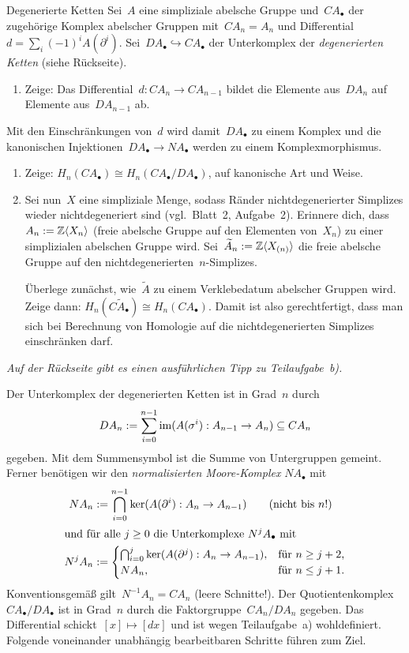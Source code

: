 \documentclass{uebblatt}
\begin{document}
\begin{aufgabe}{Degenerierte Ketten}
Sei~$A$ eine simpliziale abelsche Gruppe und~$CA_\bullet$ der zugehörige
Komplex abelscher Gruppen mit~$CA_n = A_n$ und Differential~$d = \sum_i (-1)^i
A(\partial^i)$. Sei~$DA_\bullet \hookrightarrow CA_\bullet$ der Unterkomplex
der \emph{degenerierten Ketten} (siehe Rückseite).
\begin{enumerate}
\item Zeige: Das Differential~$d : CA_n \to CA_{n-1}$ bildet die Elemente
aus~$DA_n$ auf Elemente aus~$DA_{n-1}$ ab.
\end{enumerate}
Mit den Einschränkungen von~$d$ wird damit~$DA_\bullet$ zu einem Komplex und die
kanonischen Injektionen~$DA_\bullet \to NA_\bullet$ werden zu einem Komplexmorphismus.
\begin{enumerate}
\addtocounter{enumi}{1}
\item Zeige: $H_n(CA_\bullet) \cong H_n(CA_\bullet/DA_\bullet)$, auf kanonische
Art und Weise.
\item Sei nun~$X$ eine simpliziale Menge, sodass Ränder nichtdegenerierter
Simplizes wieder nichtdegeneriert sind (vgl.~Blatt~2, Aufgabe~2). Erinnere
dich, dass~$A_n := \mathbb{Z}\langle X_n \rangle$ (freie abelsche Gruppe auf den
Elementen von~$X_n$) zu einer simplizialen abelschen Gruppe wird.
Sei~$\widetilde A_n := \mathbb{Z}\langle X_{(n)} \rangle$ die freie abelsche Gruppe
auf den nichtdegenerierten~$n$-Simplizes.

Überlege zunächst, wie~$\widetilde A$ zu einem Verklebedatum abelscher
Gruppen wird.
Zeige dann: $H_n(C\widetilde A_\bullet) \cong H_n(CA_\bullet)$. Damit ist also
gerechtfertigt, dass man sich bei Berechnung von Homologie auf die
nichtdegenerierten Simplizes einschränken darf.
\end{enumerate}

\emph{Auf der Rückseite gibt es einen ausführlichen Tipp zu Teilaufgabe~b).}
\end{aufgabe}

Der Unterkomplex der degenerierten Ketten ist in Grad~$n$ durch
\[ DA_n := \sum_{i=0}^{n-1} \operatorname{im}(A(\sigma^i) : A_{n-1} \to A_n) \subseteq
CA_n \]
gegeben. Mit dem Summensymbol ist die Summe von Untergruppen gemeint. Ferner
benötigen wir den \emph{normalisierten Moore-Komplex} $NA_\bullet$ mit
\begin{align*}
  NA_n &:= \bigcap_{i=0}^{n-1} \operatorname{ker}(A(\partial^i) : A_n \to A_{n-1})
\qquad\text{(nicht bis~$n$!)} \\
\intertext{und für alle~$j \geq 0$ die Unterkomplexe~$N^jA_\bullet$ mit}
  N^jA_n &:= \begin{cases}
  \bigcap_{i=0}^j \operatorname{ker}(A(\partial^j) : A_n \to A_{n-1}), &
  \text{für~$n \geq j + 2$,} \\
  NA_n, &
  \text{für~$n \leq j + 1$.} \end{cases}
\end{align*}
Konventionsgemäß gilt~$N^{-1}A_n = CA_n$ (leere Schnitte!).
Der Quotientenkomplex~$CA_\bullet/DA_\bullet$ ist in Grad~$n$ durch die
Faktorgruppe~$CA_n/DA_n$ gegeben. Das Differential schickt~$[x] \mapsto [dx]$
und ist wegen Teilaufgabe~a) wohldefiniert. Folgende voneinander unabhängig
bearbeitbaren Schritte führen zum Ziel.
\end{document}
